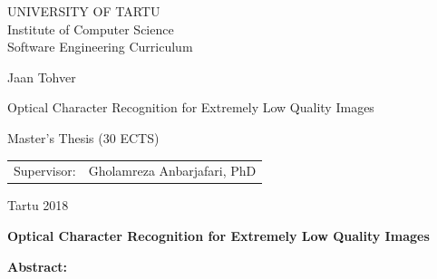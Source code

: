 \documentclass[12pt]{article}
\begin{document}
\thispagestyle{empty}
\begin{center}

\large
UNIVERSITY OF TARTU\\%
Institute of Computer Science\\
Software Engineering Curriculum\\%

\vspace{25mm}

\Large Jaan Tohver

\vspace{4mm}

\huge Optical Character Recognition for Extremely Low Quality Images

\vspace{20mm}

\Large Master's Thesis (30 ECTS)

\end{center}

\vspace{2mm}

\begin{flushright}
 {
 \setlength{\extrarowheight}{5pt}
 \begin{tabular}{r l} 
  \sffamily Supervisor: & \sffamily Gholamreza Anbarjafari, PhD
 \end{tabular}
 }
\end{flushright}


\vfill
\centerline{Tartu 2018}




\newpage

\noindent\textbf{\large Optical Character Recognition for Extremely Low Quality Images}

\vspace*{3ex}

\noindent\textbf{Abstract:}\\
\end{document}
